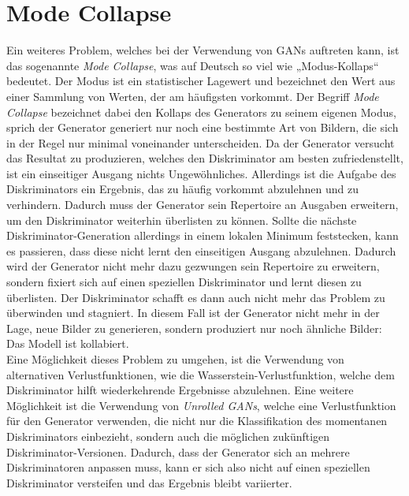\section{Mode Collapse}

\noindent Ein weiteres Problem, welches bei der Verwendung von \acp{GAN} auftreten kann, ist das sogenannte \textit{Mode Collapse}, was auf Deutsch so viel wie „Modus-Kollaps“ bedeutet. Der Modus ist ein statistischer Lagewert und bezeichnet den Wert aus einer Sammlung von Werten, der am häufigsten vorkommt. Der Begriff \textit{Mode Collapse} bezeichnet dabei den Kollaps des Generators zu seinem eigenen Modus, sprich der Generator generiert nur noch eine bestimmte Art von Bildern, die sich in der Regel nur minimal voneinander unterscheiden.  Da der Generator versucht das Resultat zu produzieren, welches den Diskriminator am besten zufriedenstellt, ist ein einseitiger Ausgang nichts Ungewöhnliches. Allerdings ist die Aufgabe des Diskriminators ein Ergebnis, das zu häufig vorkommt abzulehnen und zu verhindern. Dadurch muss der Generator sein Repertoire an Ausgaben erweitern, um den Diskriminator weiterhin überlisten zu können. Sollte die nächste Diskriminator-Generation allerdings in einem lokalen Minimum feststecken, kann es passieren, dass diese nicht lernt den einseitigen Ausgang abzulehnen. Dadurch wird der Generator nicht mehr dazu gezwungen sein Repertoire zu erweitern, sondern fixiert sich auf einen speziellen Diskriminator und lernt diesen zu überlisten. Der Diskriminator schafft es dann auch nicht mehr das Problem zu überwinden und stagniert. In diesem Fall ist der Generator nicht mehr in der Lage, neue Bilder zu generieren, sondern produziert nur noch ähnliche Bilder: Das Modell ist kollabiert. \\

\noindent Eine Möglichkeit dieses Problem zu umgehen, ist die Verwendung von alternativen Verlustfunktionen, wie die Wasserstein-Verlustfunktion, welche dem Diskriminator hilft wiederkehrende Ergebnisse abzulehnen. Eine weitere Möglichkeit ist die Verwendung von \textit{Unrolled GANs}, welche eine Verlustfunktion für den Generator verwenden, die nicht nur die Klassifikation des momentanen Diskriminators einbezieht, sondern auch die möglichen zukünftigen Diskriminator-Versionen. Dadurch, dass der Generator sich an mehrere Diskriminatoren anpassen muss, kann er sich also nicht auf einen speziellen Diskriminator versteifen und das Ergebnis bleibt variierter.  \cite{training}

\newpage
